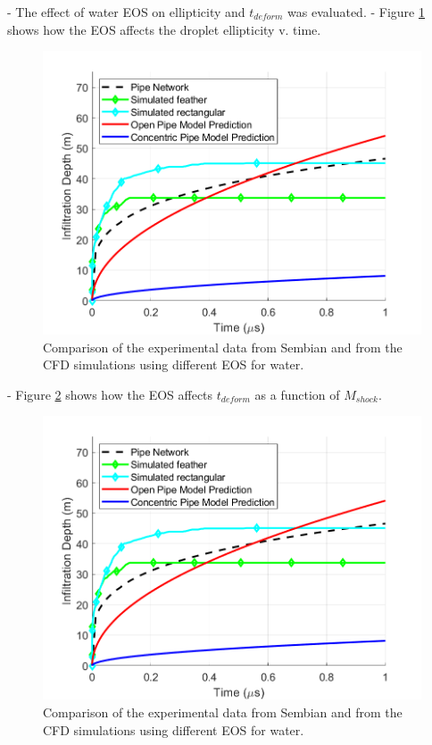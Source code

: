 \documentclass{UCF_ETD}
\begin{document}
- The effect of water EOS on ellipticity and $t_{deform}$ was evaluated.
- Figure \ref{fig:EOS_ellipticity} shows how the EOS affects the droplet ellipticity v. time.

\begin{figure}
\centering
\includegraphics[width=\textwidth]{Figures/EOS_drop_shape.png}
\caption{Comparison of the experimental data from Sembian \cite{Sembian} and from the CFD simulations using different EOS for water.}
\label{fig:EOS_ellipticity}
\end{figure}

- Figure \ref{fig:EOS_deform} shows how the EOS affects $t_{deform}$ as a function of $M_{shock}$.

\begin{figure}
\centering
\includegraphics[width=\textwidth]{Figures/EOS_drop_shape.png}
\caption{Comparison of the experimental data from Sembian \cite{Sembian} and from the CFD simulations using different EOS for water.}
\label{fig:EOS_deform}
\end{figure}
\end{document}
